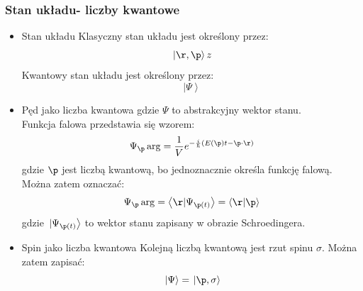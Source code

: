 \subsubsection{Stan układu- liczby kwantowe}
\begin{itemize}
\item Stan układu
Klasyczny stan układu jest określony przez:
\begin{equation} \left.|\r,\p\right>z\end{equation}
Kwantowy stan układu jest określony przez:
\begin{equation} \left.|\Psi\right>\end{equation}
\item Pęd jako liczba kwantowa
gdzie $\Psi$ to abstrakcyjny wektor stanu.\\
Funkcja falowa przedstawia się wzorem:
\begin{equation}\Psi_{\p}\arg=\frac{1}{V}e^{-\frac{i}{\hbar}(E(\p)t-\p\cdot\r)}\end{equation}
gdzie $\p$ jest liczbą kwantową, bo jednoznacznie określa funkcję falową. Można zatem oznaczać:
\begin{equation} \Psi_{\p}\arg=\left< \r|\Psi_{\p(t)}\right>=\left< \r|\p\right>\end{equation}
gdzie $\left.|\Psi_{\p(t)}\right>$ to wektor stanu zapisany w obrazie Schroedingera.\\
\item Spin jako liczba kwantowa
Kolejną liczbą kwantową jest rzut spinu $\sigma$. Można zatem zapisać:
\begin{equation}\left.|\Psi\right>=\left.|\p,\sigma\right>\end{equation}
\end{itemize}

